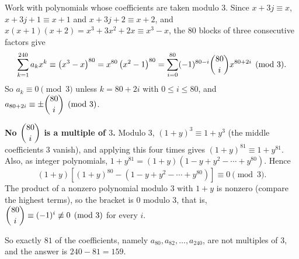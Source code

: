 Work with polynomials whose coefficients are taken modulo $3$. Since $x+3j\equiv x$, $x+3j+1\equiv x+1$ and $x+3j+2\equiv x+2$, and $x(x+1)(x+2)=x^3+3x^2+2x\equiv x^3-x$, the $80$ blocks of three consecutive factors give
\[\sum_{k=1}^{240}a_kx^k\equiv\left(x^3-x\right)^{80}=x^{80}\left(x^2-1\right)^{80}=\sum_{i=0}^{80}(-1)^{80-i}\dbinom{80}{i}x^{80+2i}\pmod 3.\]
So $a_k\equiv0\pmod3$ unless $k=80+2i$ with $0\le i\le80$, and $a_{80+2i}\equiv\pm\dbinom{80}{i}\pmod3$.

\textbf{No $\dbinom{80}{i}$ is a multiple of $3$.} Modulo $3$, $(1+y)^3\equiv1+y^3$ (the middle coefficients $3$ vanish), and applying this four times gives $(1+y)^{81}\equiv1+y^{81}$. Also, as integer polynomials, $1+y^{81}=(1+y)\left(1-y+y^2-\cdots+y^{80}\right)$. Hence
\[(1+y)\left[(1+y)^{80}-\left(1-y+y^2-\cdots+y^{80}\right)\right]\equiv0\pmod3.\]
The product of a nonzero polynomial modulo $3$ with $1+y$ is nonzero (compare the highest terms), so the bracket is $0$ modulo $3$, that is, $\dbinom{80}{i}\equiv(-1)^i\not\equiv0\pmod3$ for every $i$.

So exactly $81$ of the coefficients, namely $a_{80},a_{82},\dots,a_{240}$, are not multiples of $3$, and the answer is $240-81=\boxed{159}$.
